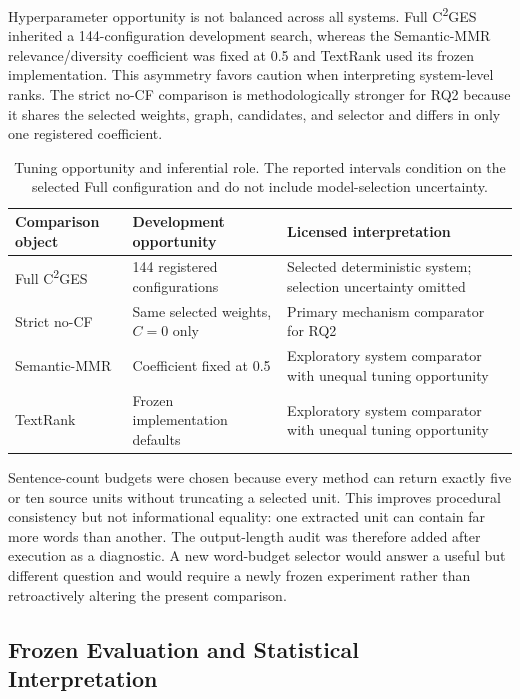 \documentclass[applsci,article,submit,moreauthors]{Definitions/mdpi}
\newcommand{\cges}{C\textsuperscript{2}GES}
\begin{document}
Hyperparameter opportunity is not balanced across all systems. Full \cges{} inherited a 144-configuration development search, whereas the Semantic-MMR relevance/diversity coefficient was fixed at 0.5 and TextRank used its frozen implementation. This asymmetry favors caution when interpreting system-level ranks. The strict no-CF comparison is methodologically stronger for RQ2 because it shares the selected weights, graph, candidates, and selector and differs in only one registered coefficient.

\begin{table}[H]
\caption{Tuning opportunity and inferential role. The reported intervals condition on the selected Full configuration and do not include model-selection uncertainty.}
\label{tab:tuning-opportunity}\centering\small
\begin{tabular}{p{}p{}p{}}
\toprule
Comparison object & Development opportunity & Licensed interpretation\\
\midrule
Full \cges{} & 144 registered configurations & Selected deterministic system; selection uncertainty omitted\\
Strict no-CF & Same selected weights, $C=0$ only & Primary mechanism comparator for RQ2\\
Semantic-MMR & Coefficient fixed at 0.5 & Exploratory system comparator with unequal tuning opportunity\\
TextRank & Frozen implementation defaults & Exploratory system comparator with unequal tuning opportunity\\
\bottomrule
\end{tabular}
\end{table}

Sentence-count budgets were chosen because every method can return exactly five or ten source units without truncating a selected unit. This improves procedural consistency but not informational equality: one extracted unit can contain far more words than another. The output-length audit was therefore added after execution as a diagnostic. A new word-budget selector would answer a useful but different question and would require a newly frozen experiment rather than retroactively altering the present comparison.

\subsection{Frozen Evaluation and Statistical Interpretation}
\end{document}
